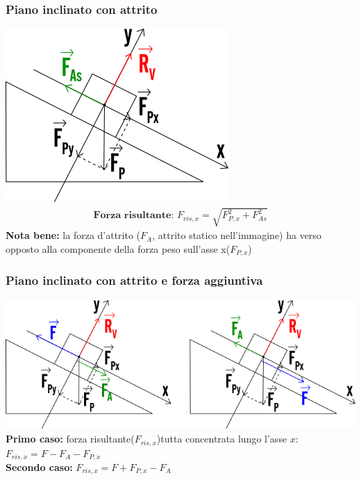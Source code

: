 \subsubsection{Piano inclinato con attrito}
\includegraphics[width=0.75 \linewidth]{Dinamica/piano-inclinato-con-attrito.png} \\
\begin{gather*}
    \textbf{Forza risultante: } F_{ris, x} = \sqrt{F_{P, x}^2 + F_{As}^2}
\end{gather*}
\textbf{Nota bene: } la forza d'attrito ($F_{A}$, attrito statico nell'immagine) ha verso opposto alla componente della forza peso sull'asse x($F_{P, x}$)
\subsubsection{Piano inclinato con attrito e forza aggiuntiva}
\includegraphics[width=\linewidth]{Dinamica/piano-inclinato-con-attrito-2.png} \\
\textbf{Primo caso: } forza risultante($F_{ris, x}$)tutta concentrata lungo l'asse $x$: $F_{ris, x} = F - F_A - F_{P, x}$ \\
\textbf{Secondo caso: } $F_{ris, x} = F + F_{P, x} - F_A$ \\


